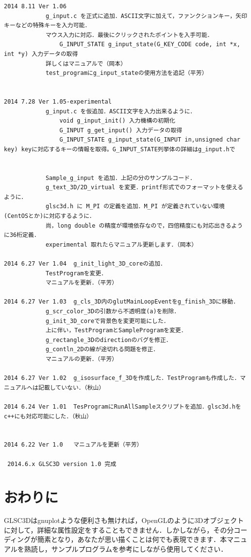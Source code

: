 \documentclass[platex,a4paper,12pt]{jsarticle}%
\begin{document}
\begin{verbatim}
2014 8.11 Ver 1.06
			g_input.c を正式に追加．ASCII文字に加えて，ファンクションキー，矢印キーなどの特殊キーを入力可能．
			マウス入力に対応．最後にクリックされたポイントを入手可能．
				G_INPUT_STATE g_input_state(G_KEY_CODE code, int *x, int *y) 入力データの取得
			詳しくはマニュアルで（岡本）
			test_programにg_input_stateの使用方法を追記（平芳）


2014 7.28 Ver 1.05-experimental
			g_input.c を仮追加．ASCII文字を入力出来るように．
				void g_input_init() 入力機構の初期化
				G_INPUT g_get_input() 入力データの取得
				G_INPUT_STATE g_input_state(G_INPUT in,unsigned char key) keyに対応するキーの情報を取得。G_INPUT_STATE列挙体の詳細はg_input.hで


			Sample_g_input を追加．上記の分のサンプルコード．
			g_text_3D/2D_virtual を変更．printf形式でのフォーマットを使えるように．
			glsc3d.h に M_PI の定義を追加．M_PI が定義されていない環境(CentOSとか)に対応するように．
			尚，long double の精度が環境依存なので，四倍精度にも対応出きるように36桁定義．
			experimental 取れたらマニュアル更新します．（岡本）

2014 6.27 Ver 1.04	g_init_light_3D_coreの追加．
			TestProgramを変更．
			マニュアルを更新．（平芳）

2014 6.27 Ver 1.03	g_cls_3D内のglutMainLoopEventをg_finish_3Dに移動．
			g_scr_color_3Dの引数から不透明度(a)を削除．
			g_init_3D_coreで背景色を変更可能にした．
			上に伴い，TestProgramとSampleProgramを変更．
			g_rectangle_3Dのdirectionのバグを修正．
			g_contln_2Dの線が途切れる問題を修正．
			マニュアルの更新．（平芳）

2014 6.27 Ver 1.02 	g_isosurface_f_3Dを作成した．TestProgramも作成した．マニュアルへは記載していない．（秋山）

2014 6.24 Ver 1.01 	TesProgramにRunAllSampleスクリプトを追加．glsc3d.hをc++にも対応可能にした．（秋山）


2014 6.22 Ver 1.0 	マニュアルを更新（平芳）

 2014.6.x GLSC3D version 1.0 完成
\end{verbatim}
\newpage
\section{おわりに}

GLSC3Dはgnuplotような便利さも無ければ，OpenGLのように3Dオブジェクトに対して，詳細な属性設定をすることもできません．しかしながら，その分コーディングが簡素となり，あなたが思い描くことは何でも表現できます．本マニュアルを熟読し，サンプルプログラムを参考にしながら使用してください．
\end{document}
